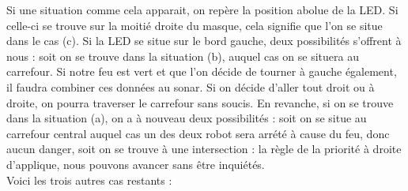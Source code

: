 \begin{itemize}
					Si une situation comme cela apparait, on repère la position abolue de la LED. Si celle-ci se trouve sur la moitié droite du masque, cela signifie que l'on se situe dans le cas (c). Si la LED se situe sur le bord gauche, deux possibilités s'offrent à nous : soit on se trouve dans la situation (b), auquel cas on se situera au carrefour. Si notre feu est vert et que l'on décide de tourner à gauche également, il faudra combiner ces données au sonar. Si on décide d'aller tout droit ou à droite, on pourra traverser le carrefour sans soucis. En revanche, si on se trouve dans la situation (a), on a à nouveau deux possibilités : soit on se situe au carrefour central auquel cas un des deux robot sera arrété à cause du feu, donc aucun danger, soit on se trouve à une intersection : la règle de la priorité à droite d'applique, nous pouvons avancer sans être inquiétés.
					\\
					Voici les trois autres cas restants :
					\begin{figure}[H]
						\centering
						\begin{subfigure}[h]{0.2\textwidth}

\end{subfigure}
\end{figure}
\end{itemize}
